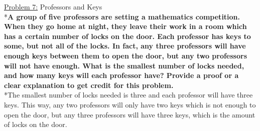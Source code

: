 \documentclass[12pt]{article}
\begin{document}
\noindent
\uline{Problem 7:} Professors and Keys
\\*\textbf{A group of five professors are setting a mathematics competition. When they go home at night, they leave
their work in a room which has a certain number of locks on the door. Each professor has keys to some, but
not all of the locks. In fact, any three professors will have enough keys between them to open the door, but
any two professors will not have enough. What is the smallest number of locks needed, and how many keys
will each professor have? Provide a proof or a clear explanation to get credit for this problem.}
\medskip
\\*The smallest number of locks needed is three and each professor will have three keys. This way, any two professors will only have two keys which is not enough to open the door, but any three professors will have three keys, which is the amount of locks on the door.
\end{document}
